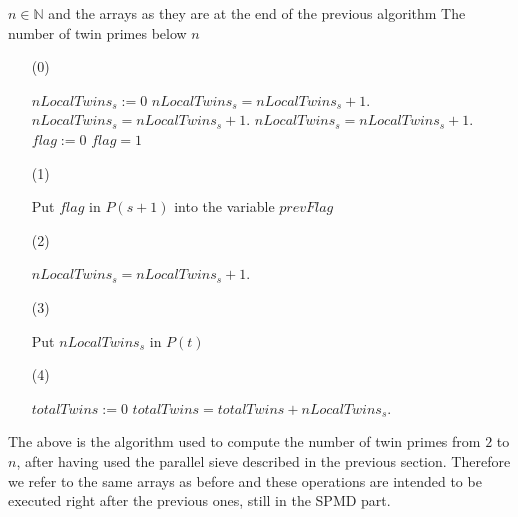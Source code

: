 \documentclass[a4paper,11pt]{article}
\newcommand{\N}{\mathbb{N}}
\begin{document}
\begin{algorithm}[H]
\begin{algorithmic}
\REQUIRE $n \in \N$ and the arrays as they are at the end of the previous algorithm
\ENSURE The number of twin primes below $n$
\end{algorithmic}


\begin{enumerate}
\item[(0)] \begin{algorithmic}
\STATE $nLocalTwins_s :=0$
\STATE 
{}
\STATE $nLocalTwins_s = nLocalTwins_s+1$.
\ENDIF
\ENDFOR
{}
\STATE $nLocalTwins_s = nLocalTwins_s+1$. 
\ENDIF
\ENDIF
\STATE
{}
\STATE $nLocalTwins_s = nLocalTwins_s+1$. 
\ENDIF
\ENDFOR
\STATE
\STATE $flag:=0$
\STATE $flag=1$
\ENDIF
\end{algorithmic}
\item[(1)] \begin{algorithmic}
\STATE Put $flag$ in $P(s+1)$ into the variable $prevFlag$
\ENDIF
\end{algorithmic}
\item[(2)] \begin{algorithmic}
\STATE $nLocalTwins_s = nLocalTwins_s+1$. 
\ENDIF
\end{algorithmic}

\item[(3)] \begin{algorithmic}
\STATE Put $nLocalTwins_s$ in $P(t)$
\ENDFOR
\end{algorithmic}

\item[(4)] \begin{algorithmic}
\STATE $totalTwins:=0$
\STATE $totalTwins = totalTwins + nLocalTwins_s$.
\ENDFOR
\end{algorithmic}

\end{enumerate}
\end{algorithm}


The above is the algorithm used to compute the number of twin primes from $2$ to $n$, after having used the parallel sieve described in the previous section. Therefore we refer to the same arrays as before and these operations are intended to be executed right after the previous ones, still in the SPMD part.
\end{document}
